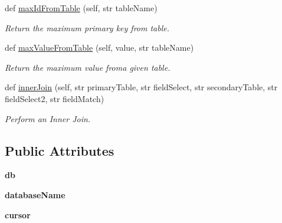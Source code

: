 \begin{DoxyCompactItemize}
def \mbox{\hyperlink{classsql_handler_1_1_sql_table_handler_aaba3f0eabad64b67ba40c82d4f7767ae}{max\+Id\+From\+Table}} (self, str table\+Name)
\begin{DoxyCompactList}\small\item\em Return the maximum primary key from table. \end{DoxyCompactList}\item 
\mbox{\label{classsql_handler_1_1_sql_table_handler_a9b6cd30d7a66446a90148a4fc1fd25a6}} 
def \mbox{\hyperlink{classsql_handler_1_1_sql_table_handler_a9b6cd30d7a66446a90148a4fc1fd25a6}{max\+Value\+From\+Table}} (self, value, str table\+Name)
\begin{DoxyCompactList}\small\item\em Return the maximum value froma given table. \end{DoxyCompactList}\item 
\mbox{\label{classsql_handler_1_1_sql_table_handler_a0fb215bae725756d2d481d17bced197c}} 
def \mbox{\hyperlink{classsql_handler_1_1_sql_table_handler_a0fb215bae725756d2d481d17bced197c}{inner\+Join}} (self, str primary\+Table, str field\+Select, str secondary\+Table, str field\+Select2, str field\+Match)
\begin{DoxyCompactList}\small\item\em Perform an Inner Join. \end{DoxyCompactList}\end{DoxyCompactItemize}
\subsection*{Public Attributes}
\begin{DoxyCompactItemize}
\item 
\mbox{\label{classsql_handler_1_1_sql_table_handler_ada170d8ab0c04adf6287db974402ddf8}} 
{\bfseries db}
\item 
\mbox{\label{classsql_handler_1_1_sql_table_handler_ac623d974cb22588805eb13be7734cf20}} 
{\bfseries database\+Name}
\item 
\mbox{\label{classsql_handler_1_1_sql_table_handler_a7bdec7849bd13c933e5cc56e344babb8}} 
{\bfseries cursor}
\end{DoxyCompactItemize}


